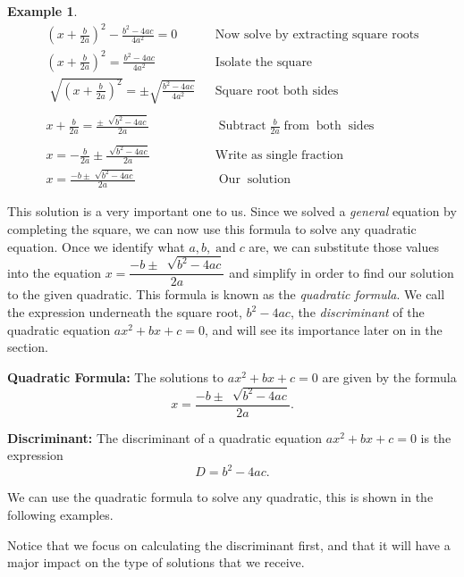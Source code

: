 \documentclass[12pt]{book}
\theoremstyle{definition}
\newtheorem{example}{Example}
\newcommand{\tmop}[1]{\ensuremath{\operatorname{#1}}}
\begin{document}
\begin{example}
\begin{eqnarray*}
    \left( x + \frac{b}{2a}\right)^2-\frac{b^2 - 4 a c}{4 a^2}=0 & & \text{Now~solve~by~extracting~square~roots}\\
    \left( x + \frac{b}{2a}\right)^2=\frac{b^2 - 4 a c}{4 a^2} & & \text{Isolate~the~square}\\
    \sqrt[]{\left( x + \frac{b}{2 a} \right)^2} = \pm \sqrt{\frac{b^2 - 4 ac}{4 a^2}} &  & \tmop{Square~root~both~sides}\\
    &  & \\
    x + \frac{b}{2 a} = \frac{\pm~ \sqrt[]{b^2 - 4 a c}}{2 a} &  & \tmop{Subtract} \frac{b}{2 a} \tmop{from} \tmop{both} \tmop{sides}\\
    &  & \\
    x = -\frac{b}{2a} \pm \frac{\sqrt[]{b^2 - 4 a c}}{2 a} &  & \text{Write as single fraction}\\
    x=\frac{- b \pm \sqrt[]{b^2 - 4 a c}}{2 a} & &  \tmop{Our} \tmop{solution}
	\end{eqnarray*}
\end{example}

This solution is a very important one to us. Since we solved a {\it general} equation by completing the square, we can now use this formula to solve any quadratic equation. Once we identify what $a, b, \tmop{and} c$ are, we can substitute those values into the equation $x = \dfrac{- b \pm~ \sqrt[]{b^2 - 4 ac}}{2 a}$ and simplify in order to find our solution to the given quadratic. This formula is known as the {\it quadratic formula}.  We call the expression underneath the square root, $b^2 - 4ac$, the {\it discriminant} of the quadratic equation $ax^2+bx+c=0$, and will see its importance later on in the section.\par
{\bf Quadratic Formula:} The solutions to $ax^2+bx+c=0$ are given by the formula $$x = \dfrac{- b \pm~ \sqrt[]{b^2 - 4 a c}}{2 a}.$$

{\bf Discriminant:} The discriminant of a quadratic equation $ax^2+bx+c=0$ is the expression  $$D=b^2 - 4 a c.$$

We can use the quadratic formula to solve any quadratic, this is shown in the following examples. 

Notice that we focus on calculating the discriminant first, and that it will have a major impact on the type of solutions that we receive.
\end{document}

